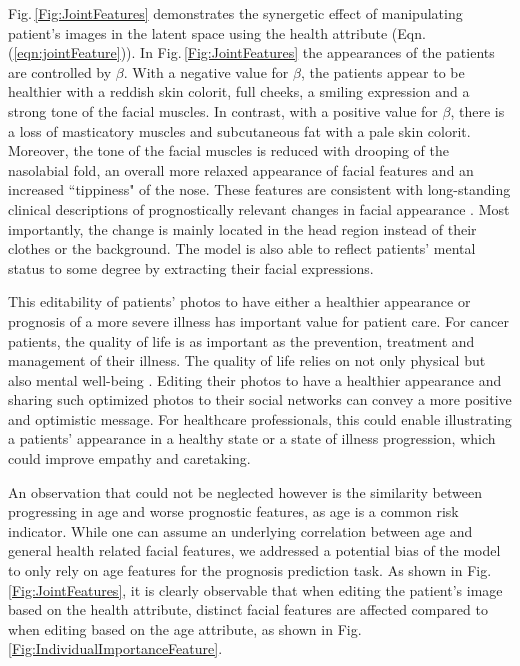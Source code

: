 \documentclass[runningheads]{llncs}
\newcommand{\vw}{\boldsymbol{w}}
\begin{document}
Fig.\,\ref{Fig:JointFeatures} demonstrates the synergetic effect of manipulating patient's images in the latent space using the health attribute
 (Eqn.\,(\ref{eqn:jointFeature})). In Fig.\,\ref{Fig:JointFeatures} the appearances of the patients are controlled by $\beta$. With a negative value for $\beta$, the patients appear to be healthier with a reddish skin colorit, full cheeks, a smiling expression and a strong tone of the facial muscles.
 In contrast, with a positive value for $\beta$, there is a loss of masticatory muscles and subcutaneous fat with a pale skin colorit. Moreover, the tone of the facial muscles is reduced with drooping of the nasolabial fold, an overall more relaxed appearance of facial features and an increased ``tippiness" of the nose. These features are consistent with long-standing clinical descriptions of prognostically relevant changes in facial appearance \cite{hui2015diagnostic, withington2005hippocratic}. Most importantly, the change is mainly located in the head region instead of their clothes or the background. The model is also able to reflect patients' mental status to some degree by extracting their facial expressions.
 
 This editability of patients' photos to have either a healthier appearance or prognosis of a more severe illness has important value for patient care. For cancer patients, the quality of life is as important as the prevention, treatment and management of their illness. The quality of life relies on not only physical but also mental well-being \cite{rankin2003perceived,de2017quality}. Editing their photos to have a healthier appearance and sharing such optimized photos to their social networks can convey a more positive and optimistic message. For healthcare professionals, this could enable illustrating a patients' appearance in a healthy state or a state of illness progression, which could improve empathy and caretaking.
 
 An observation that could not be neglected however is the similarity between progressing in age and worse prognostic features, as age is a common risk indicator. While one can assume an underlying correlation between age and general health related facial features, we addressed a potential bias of the model to only rely on age features for the prognosis prediction task. 
 As shown in Fig.\,\ref{Fig:JointFeatures}, it is clearly observable that when editing the patient's image based on the health attribute, distinct facial features are affected compared to when editing based on the age attribute, as shown in Fig.\,\ref{Fig:IndividualImportanceFeature}.
\end{document}
